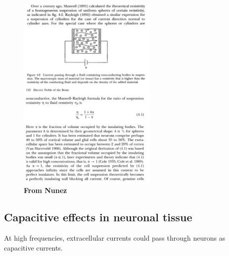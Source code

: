 \begin{figure}[!ht]
\begin{center}
\includegraphics[width=0.6\textwidth]{Figures/Sigma/resistivity_maxwell.png}
\end{center}
\caption{\textbf{From Nunez} }
\label{Sigma:fig:maxwell_resistivity}
\end{figure}

\subsection{Capacitive effects in neuronal tissue}
At high frequencies, extracellular currents could pass through neurons as capacitive currents.
